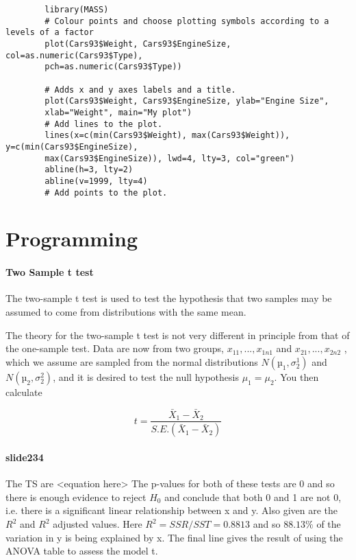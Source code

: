 \documentclass[a4paper,12pt]{article}
\begin{document}
\begin{itemize}
\begin{itemize}
		
		\large \begin{verbatim}
		library(MASS)
		# Colour points and choose plotting symbols according to a levels of a factor
		plot(Cars93$Weight, Cars93$EngineSize, col=as.numeric(Cars93$Type),
		pch=as.numeric(Cars93$Type))
		
		# Adds x and y axes labels and a title.
		plot(Cars93$Weight, Cars93$EngineSize, ylab="Engine Size",
		xlab="Weight", main="My plot")
		# Add lines to the plot.
		lines(x=c(min(Cars93$Weight), max(Cars93$Weight)), y=c(min(Cars93$EngineSize),
		max(Cars93$EngineSize)), lwd=4, lty=3, col="green")
		abline(h=3, lty=2)
		abline(v=1999, lty=4)
		# Add points to the plot.
		\end{verbatim}\large
		
		\newpage
		\chapter{Programming}
		
		
		
		
		
		
		
		\subsubsection{Two Sample t test}
		
		The two-sample t test is used to test the hypothesis that two samples may
		be assumed to come from distributions with the same mean.
		
		The theory for the two-sample t test is not very different in principle from
		that of the one-sample test. Data are now from two groups, $x_{11}, . . . , x_{1n1}$
		and $x_{21}, . . . , x_{2n2}$ , which we assume are sampled from the normal distributions
		$N(µ_{1}, \sigma^{1}_{2} )$ and
		$N(µ_{2}, \sigma^{2}_{2} )$, and it is desired to test the null hypothesis
		$\mu_{1} = \mu_{2}$. You then calculate
		
		\[
		t = \frac{\bar{X}_{1}-\bar{X}_{2}}{S.E.(\bar{X}_{1}-\bar{X}_{2})}
		\]
		
		
		
		
		\subsubsection{slide234}
		The TS are <equation here>  
		The p-values for both of these tests are 0 and so there is enough evidence to reject $H_0$ and conclude that both 0 and 1 are not 0, i.e. there is a significant linear relationship between x and y. 
		Also given are the $R^2$ and $R^2$ adjusted values. Here $R^2 = SSR/SST = 0.8813$ and so $88.13\%$ of the variation in y is being explained by x. 
		The final line gives the result of using the ANOVA table to assess the model t.
		

\end{itemize}
\end{itemize}
\end{document}
